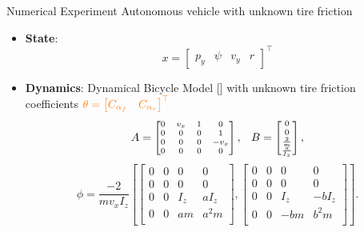 \documentclass[slideopt,A4,showboxes,svgnames]{beamer}
\begin{document}
\begin{frame}{Numerical Experiment}
Autonomous vehicle with {\orange unknown tire friction}
\pause
\begin{itemize}[<+->]
	\item \textbf{State}: \useshortskip $$x = \begin{bmatrix} {p_y} & {\psi} & {v_y} & {r} \end{bmatrix}^\top $$
	\item \textbf{Dynamics}: Dynamical Bicycle Model [\cite{awan2014compensation}] with unknown tire friction coefficients ${\color{orange} \theta = \begin{bmatrix} C_{\alpha_f} & C_{\alpha_r}\end{bmatrix}^\top}$
	\useshortskip \[
	\scriptsize
	A = \begin{bmatrix}
	0 & v_x & 1 & 0 \\
	0 & 0 & 0 & 1 \\
	0 & 0 & 0 & - v_x \\
	0 & 0 & 0 & 0
	\end{bmatrix},\quad
	B =
	\begin{bmatrix}
	0 \\
	0 \\
	\frac{2}{m} \\
	\frac{a}{I_z}
	\end{bmatrix},
	\]
	\[
	\phi = \frac{-2}{m v_x I_z}\left[\begin{bmatrix}
	0 & 0 & 0 & 0 \\
	0 & 0 & 0 & 0 \\
	0 & 0 & I_z & a I_z \\
	0 & 0 & a m & a^2 m \\
	\end{bmatrix},\begin{bmatrix}
	0 & 0 & 0 & 0 \\
	0 & 0 & 0 & 0 \\
	0 & 0 & I_z & -b I_z \\
	0 & 0 & - bm & b^2 m \\
	\end{bmatrix}\right].
	\]
\end{itemize}
\end{frame}
\end{document}
